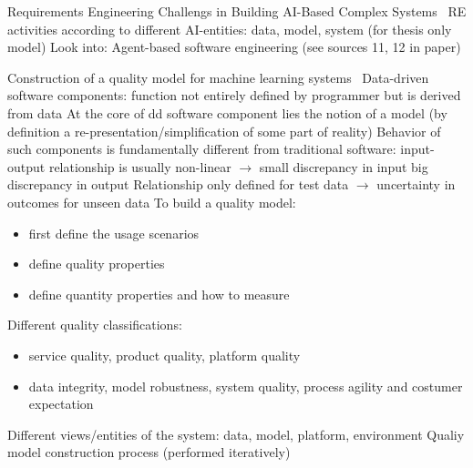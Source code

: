 Requirements Engineering Challengs in Building AI-Based Complex Systems~\cite{belani_requirements_2019}
RE activities according to different AI-entities: data, model, system (for thesis only model)
Look into: Agent-based software engineering (see sources 11, 12 in paper)

Construction of a quality model for machine learning systems~\cite{siebert_construction_2021}
Data-driven software components: function not entirely defined by programmer but is derived from data
At the core of dd software component lies the notion of a model (by definition a
re-presentation/simplification of some part of reality)
Behavior of such components is fundamentally different from traditional software: input-output
relationship is usually non-linear $\rightarrow$ small discrepancy in input big discrepancy in output
Relationship only defined for test data $\rightarrow$ uncertainty in outcomes for unseen data
To build a quality model:
\begin{itemize}
    \item first define the usage scenarios
    \item define quality properties
    \item define quantity properties and how to measure
\end{itemize}
Different quality classifications:
\begin{itemize}
    \item service quality, product quality, platform quality
    \item data integrity, model robustness, system quality, process agility and costumer expectation
\end{itemize}
Different views/entities of the system: data, model, platform, environment
Qualiy model construction process (performed iteratively)
